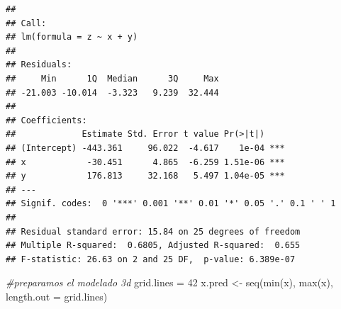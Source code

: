 \documentclass[
]{article}
\newenvironment{Shaded}{\begin{snugshade}}{\end{snugshade}}
\newcommand{\AttributeTok}[1]{\textcolor[rgb]{0.77,0.63,0.00}{#1}}
\newcommand{\CommentTok}[1]{\textcolor[rgb]{0.56,0.35,0.01}{\textit{#1}}}
\newcommand{\DecValTok}[1]{\textcolor[rgb]{0.00,0.00,0.81}{#1}}
\newcommand{\FunctionTok}[1]{\textcolor[rgb]{0.00,0.00,0.00}{#1}}
\newcommand{\NormalTok}[1]{#1}
\newcommand{\OtherTok}[1]{\textcolor[rgb]{0.56,0.35,0.01}{#1}}
\begin{document}
\begin{verbatim}
## 
## Call:
## lm(formula = z ~ x + y)
## 
## Residuals:
##     Min      1Q  Median      3Q     Max 
## -21.003 -10.014  -3.323   9.239  32.444 
## 
## Coefficients:
##             Estimate Std. Error t value Pr(>|t|)    
## (Intercept) -443.361     96.022  -4.617    1e-04 ***
## x            -30.451      4.865  -6.259 1.51e-06 ***
## y            176.813     32.168   5.497 1.04e-05 ***
## ---
## Signif. codes:  0 '***' 0.001 '**' 0.01 '*' 0.05 '.' 0.1 ' ' 1
## 
## Residual standard error: 15.84 on 25 degrees of freedom
## Multiple R-squared:  0.6805, Adjusted R-squared:  0.655 
## F-statistic: 26.63 on 2 and 25 DF,  p-value: 6.389e-07
\end{verbatim}

\begin{Shaded}
\begin{Highlighting}[]
\CommentTok{\#preparamos el modelado 3d}
\NormalTok{grid.lines }\OtherTok{=} \DecValTok{42}
\NormalTok{x.pred }\OtherTok{\textless{}{-}} \FunctionTok{seq}\NormalTok{(}\FunctionTok{min}\NormalTok{(x), }\FunctionTok{max}\NormalTok{(x), }\AttributeTok{length.out =}\NormalTok{ grid.lines)}



\end{Highlighting}
\end{Shaded}
\end{document}
